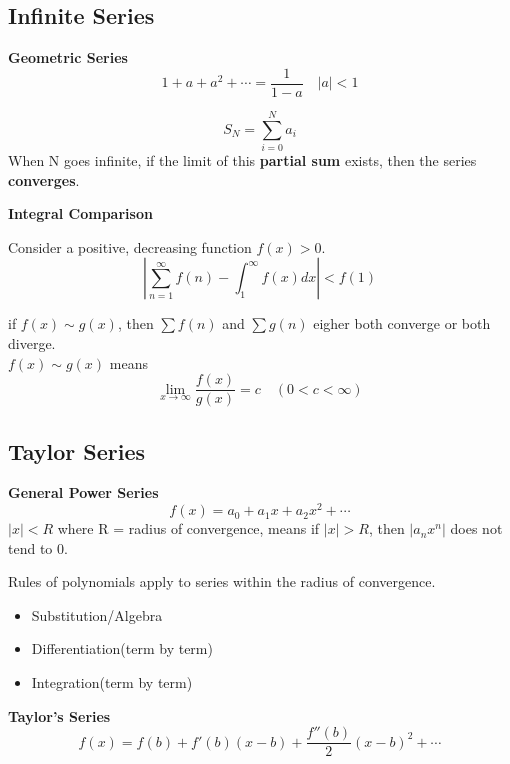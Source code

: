 \documentclass{article}
\newcommand\limitx[1]{\lim_{x \to #1}}
\newcommand\improperint[1]{\int_{#1}^\infty}
\begin{document}
\subsection{Infinite Series}

\textbf{Geometric Series}
$$1 + a + a^2 + \cdots = \frac{1}{1-a} \quad |a| < 1$$

$$S_N = \sum\limits_{i=0}^{N}a_i$$
When N goes infinite, if the limit of this \textbf{partial sum} exists, then the series \textbf{converges}.

\textbf{Integral Comparison}

Consider a positive, decreasing function $f(x) > 0$.
$$|\sum\limits_{n=1}^{\infty}f(n) - \improperint{1}f(x)dx| < f(1)$$

if $f(x) \sim g(x)$, then $\sum f(n)$ and $\sum g(n)$ eigher both converge or both diverge. \\
$f(x) \sim g(x)$ means
$$\limitx{\infty}\frac{f(x)}{g(x)} = c \quad (0 < c < \infty)$$

\subsection{Taylor Series}

\textbf{General Power Series}
$$f(x) = a_0 + a_1x + a_2x^2 + \cdots$$
$|x| < R$ where R = radius of convergence, means if $|x| > R$, then $|a_nx^n|$ does not tend to 0.

Rules of polynomials apply to series within the radius of convergence.
\begin{itemize}
  \item Substitution/Algebra
  \item Differentiation(term by term)
  \item Integration(term by term)
\end{itemize}

\textbf{Taylor's Series}
$$f(x) = f(b) + f'(b)(x-b) + \frac{f''(b)}{2}(x-b)^2 + \cdots $$
\end{document}

